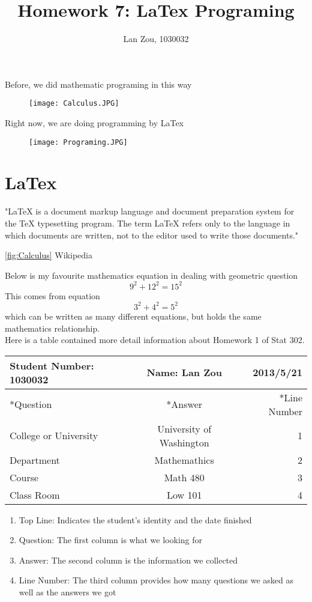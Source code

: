 \documentclass[11pt]{article}
\begin{document}
\title {Homework 7: LaTex Programing}
\author{Lan Zou, 1030032}
\maketitle


Before, we did mathematic programing in this way
\begin{figure}[h]
 \begin{center}
  \texttt{[image: Calculus.JPG]}
 \end{center}
\end{figure}

Right now, we are doing programming by LaTex
\begin{figure}[h]
 \begin{center}
  \texttt{[image: Programing.JPG]}
 \end{center}
\end{figure}

\section{LaTex}
"LaTeX is a document markup language and document preparation system for the TeX typesetting program. The term LaTeX refers only to the language in which documents are written, not to the editor used to write those documents." 

\label{fig:Calculus}
\ref{fig:Calculus}
Wikipedia

\newpage
Below is my favourite mathematics equation
in dealing with
geometric question
\[
9^2 + 12^2 = 15^2
\]
This comes from equation
\[
3^2 + 4^2 = 5^2
\]which can be written as many different equations, but holds the same mathematics relationship. 
\[
\]
Here is a table contained more detail information about Homework 1 of Stat 302.
\begin{center}
 \begin{tabular}{| l | c | r |}
  \hline
    Student Number: 1030032 & Name: Lan Zou & 2013/5/21 \\ \hline
    \hline
    *Question & *Answer & *Line Number \\ \hline
  College or University & University of Washington & 1 \\ \hline
 	Department & Mathemathics & 2\\ \hline
 	Course & Math 480 & 3\\ \hline
 	Class Room & Low 101 & 4 \\ \hline
  \hline
 \end{tabular}

\end{center}

\begin{enumerate}
\item Top Line: Indicates the student's identity and the date finished 
\item Question: The first column is what we looking for
\item Answer: The second column is the information we collected
\item Line Number: The third column provides how many questions we asked as well as the answers we got 
\end{enumerate}
\end{document}
